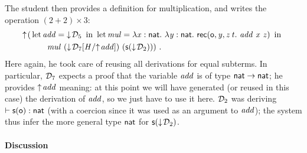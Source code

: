 \documentclass{llncs}
\begin{document}
The student then provides a definition for multiplication, and writes
the operation $(2 + 2)\times3$:
\begin{align*}
  \finfer{}(
  &\letb{add}{\fget{\md_5}}
  \letb{mul} { \tlam x {\cst{nat}} \tlam y
    {\cst{nat}} \recb \z {\var y} z t {
      \app{\var{add}}\app{\var x} {\var z}} }
  \\
  &\quad\quad\app{\var{mul}}\app
  {(\fget{\gsubst{\md_7}{\msubst H {\finfer{\var{add}}}}})}
  {(\s{\fget{\md_2}})}
  )
  \ \text{.}
\end{align*}
Here again, he took care of reusing all derivations for equal
subterms. In particular, $\md_7$ expects a proof that the variable
$\var{add}$ is of type $\cst{nat}\to\cst{nat}$; he provides
$\finfer{\var{add}}$ meaning: at this point we will have generated (or
reused in this case) the derivation of $\var{add}$, so we just have to
use it here. $\md_2$ was deriving $\vdash\s\z:\cst{nat}$ (with a
coercion since it was used as an argument to $\var{add}$); the system
thus infer the more general type $\cst{nat}$ for $\s{\fget{\md_2}}$.


\paragraph{Discussion}
\end{document}
